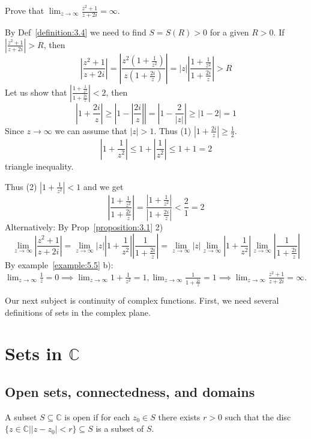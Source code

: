 \begin{example} \label{example:5.6}
     Prove that $\lim_{z \to \infty} \frac{z^2 + 1}{z + 2i} = \infty$.
\end{example}
\begin{soln}  By Def~\ref{definition:3.4} we need to find $S = S(R) > 0$ for a given $R > 0$. If $\left|\frac{z^2 + 1}{z + 2i}\right| > R$, then
\[ \left|\frac{z^2 + 1}{z + 2i}\right| = \left|\frac{z^2(1 + \frac{1}{z^2})}{z(1 + \frac{2i}{z})}\right| = |z| \left|\frac{1 + \frac{1}{z^2}}{1 + \frac{2i}{z}}\right| > R \]
Let us show that $\left|\frac{1 + \frac{1}{z^2}}{1 + \frac{2i}{z}}\right| < 2$, then
\[ \left|1 + \frac{2i}{z}\right| \geq \left|1 - \left|\frac{2i}{z}\right|\right| = \left|1 - \frac{2}{|z|}\right| \geq \left|1 - 2\right| = 1 \]
Since $z \to \infty$ we can assume that $|z| > 1$. Thus (1) $\left|1 + \frac{2i}{z}\right| \geq \frac{1}{2}$.
\[ \left|1 + \frac{1}{z^2}\right| \leq 1 + \left|\frac{1}{z^2}\right| \leq 1 + 1 = 2 \]
triangle inequality.

Thus (2) $\left|1 + \frac{1}{z^2}\right| < 1$ and we get
\[ \left|\frac{1 + \frac{1}{z^2}}{1 + \frac{2i}{z}}\right| = \frac{\left|1 + \frac{1}{z^2}\right|}{\left|1 + \frac{2i}{z}\right|} < \frac{2}{1} = 2 \]
Alternatively: By Prop~\ref{proposition:3.1} 2)
\[ \lim_{z \to \infty} \left|\frac{z^2 + 1}{z + 2i}\right| = \lim_{z \to \infty} |z| \left|1 + \frac{1}{z^2}\right| \left|\frac{1}{1 + \frac{2i}{z}}\right| = \lim_{z \to \infty} |z| \lim_{z \to \infty} \left|1 + \frac{1}{z^2}\right| \lim_{z \to \infty} \left|\frac{1}{1 + \frac{2i}{z}}\right| \]
By example~\ref{example:5.5} b): $\lim_{z \to \infty} \frac{1}{z} = 0 \implies \lim_{z \to \infty} 1 + \frac{1}{z^2} = 1, \lim_{z \to \infty} \frac{1}{1 + \frac{2i}{z}} = 1 \implies \lim_{z \to \infty} \frac{z^2 + 1}{z + 2i} = \infty$.
\end{soln}

Our next subject is continuity of complex functions. First, we need several definitions of sets in the complex plane.

\section{Sets in $\mathbb{C}$}

\subsection{Open sets, connectedness, and domains}

\begin{definition}\label{definition:4.1}
     A subset $S \subseteq \mathbb{C}$ is open if for each $z_0 \in S$ there exists $r > 0$ such that the disc $\{z \in \mathbb{C} | |z - z_0| < r\} \subseteq S$ is a subset of $S$.
\end{definition}

